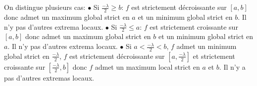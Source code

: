 \documentclass{report}
\begin{document}
\subsection{} \noindent{}\\ 
\\ 
\\
\noindent On distingue plusieurs cas: \newline
$\bullet$ Si $\frac{-\lambda}{2} \geq b$: $f$ est strictement décroissante sur $[a,b]$ donc admet un maximum global strict en $a$ et un minimum global strict en $b$. Il n'y pas d'autres extrema locaux.\newline 
$\bullet$ Si $\frac{-\lambda}{2} \leq a$: $f$ est strictement croissante sur $[a,b]$ donc admet un maximum global strict en $b$ et un minimum global strict en $a$. Il n'y pas d'autres extrema locaux. \newline
$\bullet$ Si $a<\frac{-\lambda}{2}<b$, $f$ admet un minimum global strict en $\frac{-\lambda}{2}$, $f$ est strictement décroissante sur $[a,\frac{-\lambda}{2}]$ et strictement croissante sur $[\frac{-\lambda}{2},b]$ donc $f$ admet un maximum local strict en $a$ et $b$. Il n'y a pas d'autres extremas locaux.
\end{document}
